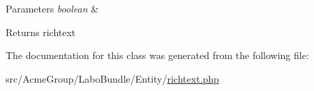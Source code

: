 \begin{DoxyParams}{Parameters}
{\em boolean} & \\
\hline
\end{DoxyParams}
\begin{DoxyReturn}{Returns}
richtext 
\end{DoxyReturn}


The documentation for this class was generated from the following file\+:\begin{DoxyCompactItemize}
\item 
src/\+Acme\+Group/\+Labo\+Bundle/\+Entity/\hyperlink{richtext_8php}{richtext.\+php}\end{DoxyCompactItemize}
